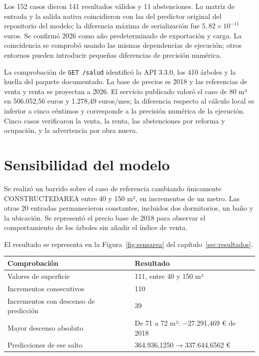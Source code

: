 \documentclass[11pt,a4paper]{article}
\newcommand{\thead}[1]{\textbf{#1}}
\newcounter{anexo}
\begin{document}
Los 152 casos dieron 141 resultados válidos y 11 abstenciones. La matriz de entrada y la salida nativa coincidieron con las del predictor original del repositorio del modelo; la diferencia máxima de serialización fue $5{,}82 \times 10^{-11}$ euros. Se confirmó 2026 como año predeterminado de exportación y carga. La coincidencia se comprobó usando las mismas dependencias de ejecución; otros entornos pueden introducir pequeñas diferencias de precisión numérica.

La comprobación de \texttt{GET /salud} identificó la API 3.3.0, los 410 árboles y la huella del paquete documentado. La base de precios es 2018 y las referencias de venta y renta se proyectan a 2026. El servicio publicado valoró el caso de 80 m² en 506.052,56 euros y 1.278,49 euros/mes; la diferencia respecto al cálculo local es inferior a cinco céntimos y corresponde a la precisión numérica de la ejecución. Cinco casos verificaron la venta, la renta, las abstenciones por reforma y ocupación, y la advertencia por obra nueva.
\clearpage{}\label{anx:\theanexo}%
\section*{\theanexo\hspace{0.6em}Sensibilidad del modelo}

Se realizó un barrido sobre el caso de referencia cambiando únicamente CONSTRUCTEDAREA entre 40 y 150 m², en incrementos de un metro. Las otras 20 entradas permanecieron constantes, incluidos dos dormitorios, un baño y la ubicación. Se representó el precio base de 2018 para observar el comportamiento de los árboles sin añadir el índice de venta.

El resultado se representa en la Figura~\ref{fig:sensarea} del capítulo~\ref{sec:resultados}.

\begin{center}
\begin{tabularx}{\linewidth}{@{}L L@{}}
\toprule
\thead{Comprobación} & \thead{Resultado} \\
\midrule
Valores de superficie & 111, entre 40 y 150 m² \\
Incrementos consecutivos & 110 \\
Incrementos con descenso de predicción & 39 \\
Mayor descenso absoluto & De 71 a 72 m²: −27.291,469 € de 2018 \\
Predicciones de ese salto & 364.936,1250 → 337.644,6562 € \\
\bottomrule
\end{tabularx}
\end{center}
\end{document}
